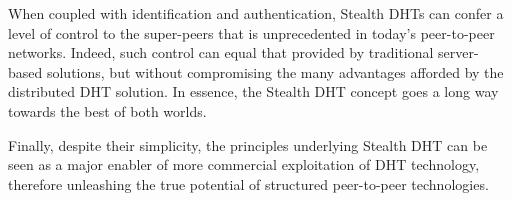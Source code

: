 \documentclass[letterpaper]{sig-alternate} %
\begin{document}
When coupled with identification and authentication, Stealth DHTs
can confer a level of control to the super-peers that is
unprecedented in today's peer-to-peer networks. Indeed, such control
can equal that provided by traditional server-based solutions, but
without compromising the many advantages afforded by the distributed
DHT solution. In essence, the Stealth DHT concept goes a long way
towards the best of both worlds.



Finally, despite their simplicity, the principles underlying Stealth
DHT can be seen as a major enabler of more commercial exploitation
of DHT technology, therefore unleashing the true potential of
structured peer-to-peer technologies.



\end{document}
